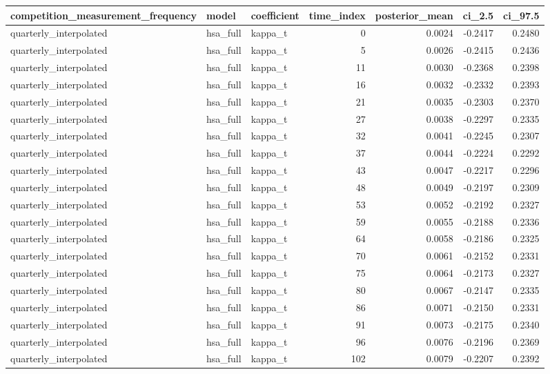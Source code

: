 \begin{tabular}{lllrrrr}
\toprule
competition\_measurement\_frequency & model & coefficient & time\_index & posterior\_mean & ci\_2.5 & ci\_97.5 \\
\midrule
quarterly\_interpolated & hsa\_full & kappa\_t & 0 & 0.0024 & -0.2417 & 0.2480 \\
quarterly\_interpolated & hsa\_full & kappa\_t & 5 & 0.0026 & -0.2415 & 0.2436 \\
quarterly\_interpolated & hsa\_full & kappa\_t & 11 & 0.0030 & -0.2368 & 0.2398 \\
quarterly\_interpolated & hsa\_full & kappa\_t & 16 & 0.0032 & -0.2332 & 0.2393 \\
quarterly\_interpolated & hsa\_full & kappa\_t & 21 & 0.0035 & -0.2303 & 0.2370 \\
quarterly\_interpolated & hsa\_full & kappa\_t & 27 & 0.0038 & -0.2297 & 0.2335 \\
quarterly\_interpolated & hsa\_full & kappa\_t & 32 & 0.0041 & -0.2245 & 0.2307 \\
quarterly\_interpolated & hsa\_full & kappa\_t & 37 & 0.0044 & -0.2224 & 0.2292 \\
quarterly\_interpolated & hsa\_full & kappa\_t & 43 & 0.0047 & -0.2217 & 0.2296 \\
quarterly\_interpolated & hsa\_full & kappa\_t & 48 & 0.0049 & -0.2197 & 0.2309 \\
quarterly\_interpolated & hsa\_full & kappa\_t & 53 & 0.0052 & -0.2192 & 0.2327 \\
quarterly\_interpolated & hsa\_full & kappa\_t & 59 & 0.0055 & -0.2188 & 0.2336 \\
quarterly\_interpolated & hsa\_full & kappa\_t & 64 & 0.0058 & -0.2186 & 0.2325 \\
quarterly\_interpolated & hsa\_full & kappa\_t & 70 & 0.0061 & -0.2152 & 0.2331 \\
quarterly\_interpolated & hsa\_full & kappa\_t & 75 & 0.0064 & -0.2173 & 0.2327 \\
quarterly\_interpolated & hsa\_full & kappa\_t & 80 & 0.0067 & -0.2147 & 0.2335 \\
quarterly\_interpolated & hsa\_full & kappa\_t & 86 & 0.0071 & -0.2150 & 0.2331 \\
quarterly\_interpolated & hsa\_full & kappa\_t & 91 & 0.0073 & -0.2175 & 0.2340 \\
quarterly\_interpolated & hsa\_full & kappa\_t & 96 & 0.0076 & -0.2196 & 0.2369 \\
quarterly\_interpolated & hsa\_full & kappa\_t & 102 & 0.0079 & -0.2207 & 0.2392 \\

\end{tabular}

